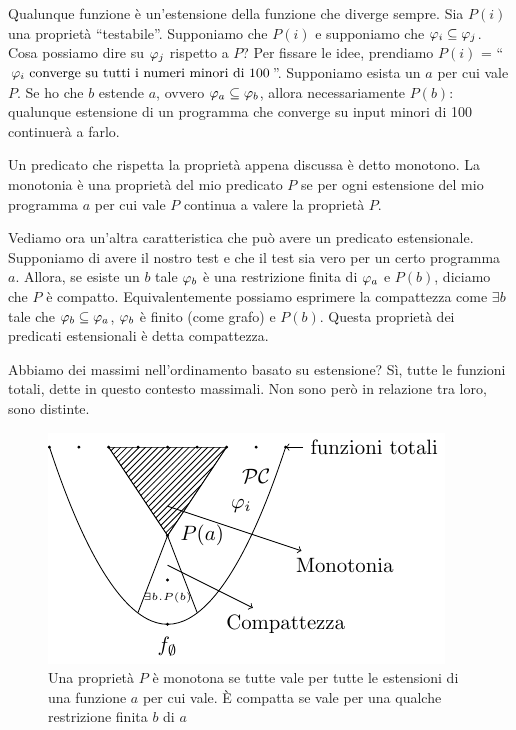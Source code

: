 Qualunque funzione è un'estensione della funzione che diverge sempre. Sia $P(i)$ una proprietà
``testabile''. Supponiamo che $P(i)$ e supponiamo che $\varphi_{i} \subseteq \varphi_{j}$. Cosa possiamo dire su
$\varphi_{j}$ rispetto a $P$? Per fissare le idee, prendiamo $P(i)$ = ``$\varphi_{i} \text{ converge su tutti i
numeri minori di 100}$''. Supponiamo esista un $a$ per cui vale $P$. Se ho che $b$ estende $a$, ovvero
$\varphi_{a} \subseteq \varphi_{b}$, allora necessariamente $P(b)$: qualunque estensione di un programma che
converge su input minori di 100 continuerà a farlo.

Un predicato che rispetta la proprietà appena discussa è detto monotono. La monotonia è una
proprietà del mio predicato $P$ se per ogni estensione del mio programma $a$ per cui vale $P$
continua a valere la proprietà $P$. 

Vediamo ora un'altra caratteristica che può avere un predicato estensionale. Supponiamo di avere il
nostro test e che il test sia vero per un certo programma $a$. Allora, se esiste un $b$ tale $\varphi_{b}$ è
una restrizione finita di $\varphi_{a}$ e $P(b)$, diciamo che $P$ è compatto. Equivalentemente possiamo
esprimere la compattezza come $\exists b$ tale che $\varphi_{b} \subseteq \varphi_{a}$, $\varphi_{b}$ è finito (come grafo)
e $P(b)$. Questa proprietà dei predicati estensionali è detta compattezza.

Abbiamo dei massimi nell'ordinamento basato su estensione? Sì, tutte le funzioni totali, dette in
questo contesto massimali. Non sono però in relazione tra loro, sono distinte.

\begin{figure}[!h]
    \centering
    \includegraphics{img/ExtensionHierarchy.pdf}
    \caption{Una proprietà $P$ è monotona se tutte vale per tutte le estensioni di una funzione $a$
    per cui vale. È compatta se vale per una qualche restrizione finita $b$ di $a$}
\end{figure}

\newpage

